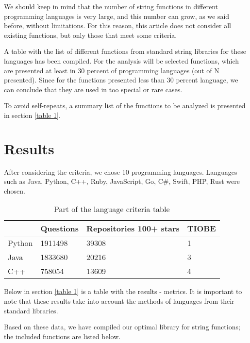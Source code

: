 \documentclass[anonymous,sigplan,review,11pt,nonacm,natbib=false]{acmart}
\begin{document}
    We should keep in mind that the number of string functions in different programming languages is very large, and this number can grow, as we said before, without limitations. For this reason, this article does not consider all existing functions, but only those that meet some criteria.

    A table with the list of different functions from standard string libraries for these languages has been compiled. For the analysis will be selected functions, which are presented at least in 30 percent of programming languages (out of N presented). Since for the functions presented less than 30 percent language, we can conclude that they are used in too special or rare cases.

    To avoid self-repeats, a summary list of the functions to be analyzed is presented in section \ref{table 1}.

    \section{Results}

    After considering the criteria, we chose 10 programming languages. Languages such as Java, Python, C++, Ruby, JavaScript, Go, C\#, Swift, PHP, Rust were chosen.


    \begin{table}[h]
        \begin{tabular}{llll}
            \hline
            & Questions
            & Repositories 100+ stars
            & TIOBE
            \\ \hline

            Python & 1911498 & 39308 & 1 \\

            Java & 1833680 & 20216 & 3 \\

            C++ & 758054 & 13609 & 4 \\ \hline
        \end{tabular}
        \caption{Part of the language criteria table}
    \end{table}

    Below in section \ref{table 1} is a table with the results - metrics. It is important to note that these results take into account the methods of languages from their standard libraries.

    Based on these data, we have compiled our optimal library for string functions; the included functions are listed below.
\end{document}
